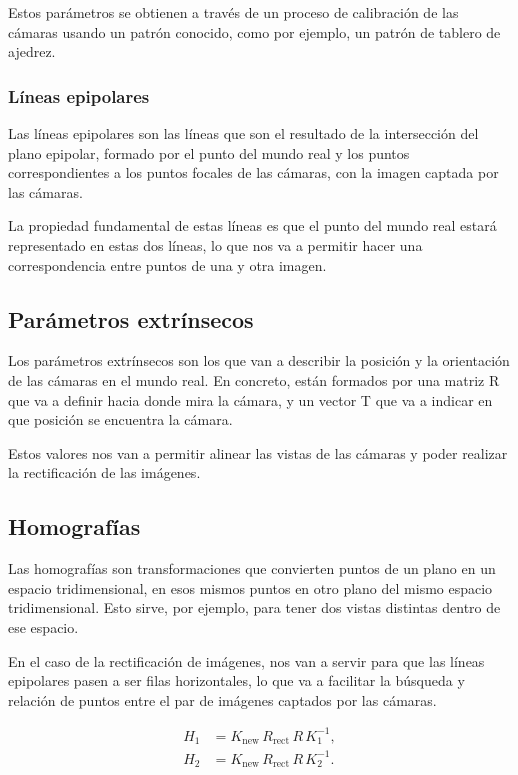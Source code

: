 Estos parámetros se obtienen a través de un proceso de calibración de las cámaras usando un patrón conocido, como por ejemplo, un patrón de tablero de ajedrez.

\subsubsection{Líneas epipolares}
Las líneas epipolares son las líneas que son el resultado de la intersección del plano epipolar, formado por el punto del mundo real y los puntos correspondientes a los puntos focales de las cámaras, con la imagen captada por las cámaras. 

La propiedad fundamental de estas líneas es que el punto del mundo real estará representado en estas dos líneas, lo que nos va a permitir hacer una correspondencia entre puntos de una y otra imagen.


\subsection{Parámetros extrínsecos}
Los parámetros extrínsecos son los que van a describir la posición y la orientación de las cámaras en el mundo real. En concreto, están formados por una matriz R que va a definir hacia donde mira la cámara, y un vector T que va a indicar en que posición se encuentra la cámara.

Estos valores nos van a permitir alinear las vistas de las cámaras y poder realizar la rectificación de las imágenes.

\subsection{Homografías}
Las homografías son transformaciones que convierten puntos de un plano en un espacio tridimensional, en esos mismos puntos en otro plano del mismo espacio tridimensional. Esto sirve, por ejemplo, para tener dos vistas distintas dentro de ese espacio.

En el caso de la rectificación de imágenes, nos van a servir para que las líneas epipolares pasen a ser filas horizontales, lo que va a facilitar la búsqueda y relación de puntos entre el par de imágenes captados por las cámaras.

\begin{align}
	H_1 &= K_{\text{new}}\,R_{\text{rect}}\,R\,K_1^{-1},\\
	H_2 &= K_{\text{new}}\,R_{\text{rect}}\,R\,K_2^{-1}.
\end{align}

